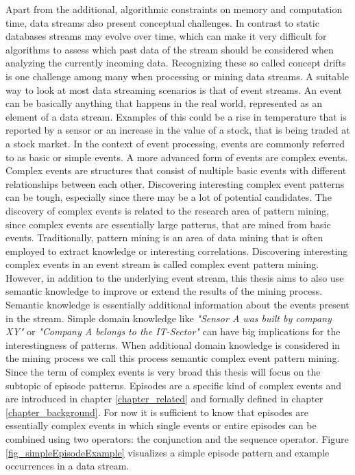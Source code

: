 Apart from the additional, algorithmic constraints on memory and computation time, data streams also present conceptual challenges. In contrast to static databases streams may evolve over time, which can make it very difficult for algorithms to assess which past data of the stream should be considered when analyzing the currently incoming data. Recognizing these so called concept drifts is one challenge among many when processing or mining data streams. \newline
A suitable way to look at most data streaming scenarios is that of event streams. An event can be basically anything that happens in the real world, represented as an element of a data stream. Examples of this could be a rise in temperature that is reported by a sensor or an increase in the value of a stock, that is being traded at a stock market. In the context of event processing, events are commonly referred to as basic or simple events. \newline
A more advanced form of events are complex events. Complex events are structures that consist of multiple basic events with different relationships between each other. Discovering interesting complex event patterns can be tough, especially since there may be a lot of potential candidates. The discovery of complex events is related to the research area of pattern mining, since complex events are essentially large patterns, that are mined from basic events. Traditionally, pattern mining is an area of data mining that is often employed to extract knowledge or interesting correlations. Discovering interesting complex events in an event stream is called complex event pattern mining. However, in addition to the underlying event stream, this thesis aims to also use semantic knowledge to improve or extend the results of the mining process. Semantic knowledge is essentially additional information about the events present in the stream. Simple domain knowledge like \textit{"Sensor A was built by company XY"} or \textit{"Company A belongs to the IT-Sector"} can have big implications for the interestingness of patterns. When additional domain knowledge is considered in the mining process we call this process semantic complex event pattern mining. \\
Since the term of complex events is very broad this thesis will focus on the subtopic of episode patterns. Episodes are a specific kind of complex events and are introduced in chapter \ref{chapter_related} and formally defined in chapter \ref{chapter_background}. For now it is sufficient to know that episodes are essentially complex events in which single events or entire episodes can be combined using two operators: the conjunction and the sequence operator. Figure \ref{fig_simpleEpisodeExample} visualizes a simple episode pattern and example occurrences in a data stream.

